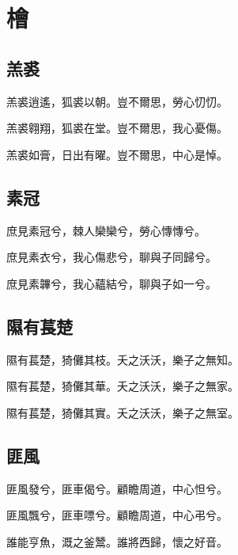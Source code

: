 \section[檜]{檜}

\subsection[羔裘]{羔裘}

羔裘逍遙，狐裘以朝。豈不爾思，勞心忉忉。

羔裘翱翔，狐裘在堂。豈不爾思，我心憂傷。

羔裘如膏，日出有曜。豈不爾思，中心是悼。

\subsection[素冠]{素冠}

庶見素冠兮，棘人欒欒兮，勞心慱慱兮。

庶見素衣兮，我心傷悲兮，聊與子同歸兮。

庶見素韠兮，我心蘊結兮，聊與子如一兮。

\subsection[隰有萇楚]{隰有萇楚}

隰有萇楚，猗儺其枝。夭之沃沃，樂子之無知。

隰有萇楚，猗儺其華。夭之沃沃，樂子之無家。

隰有萇楚，猗儺其實。夭之沃沃，樂子之無室。

\subsection[匪風]{匪風}

匪風發兮，匪車偈兮。顧瞻周道，中心怛兮。

匪風飄兮，匪車嘌兮。顧瞻周道，中心弔兮。

誰能亨魚，溉之釜鬵。誰將西歸，懷之好音。
